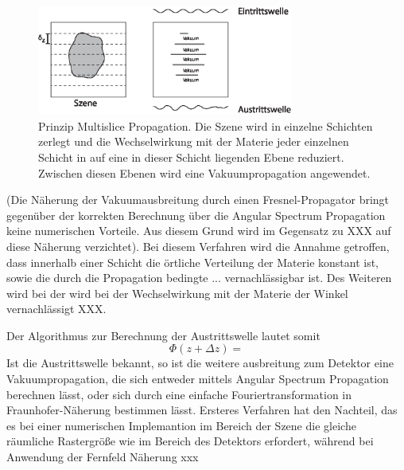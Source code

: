 	\begin{figure}
		\centering
		\includegraphics[width=0.75\textwidth]{images/multislice.eps}
		\caption[Abbildungstext im Abbildungsverzeichnis]{Prinzip Multislice Propagation. Die Szene wird in einzelne Schichten zerlegt und die Wechselwirkung mit der Materie jeder einzelnen Schicht in auf eine in dieser Schicht liegenden Ebene reduziert. Zwischen diesen Ebenen wird eine Vakuumpropagation angewendet.}
		\label{Abb:BspAbbildung}
	\end{figure} 
	
	(Die Näherung der Vakuumausbreitung durch einen Fresnel-Propagator bringt gegenüber der korrekten Berechnung über die Angular Spectrum Propagation keine numerischen Vorteile. Aus diesem Grund wird im Gegensatz zu \cite{hare}XXX auf diese Näherung verzichtet). 
	Bei diesem Verfahren wird die Annahme getroffen, dass  innerhalb einer Schicht die örtliche Verteilung der Materie konstant ist, sowie die durch die Propagation bedingte ... vernachlässigbar ist\cite{hare1994}. Des Weiteren wird bei der wird bei der Wechselwirkung mit der Materie der Winkel vernachlässigt XXX.
	
	Der Algorithmus zur Berechnung der Austrittswelle lautet somit
	\begin{equation}
\Phi(z+\Delta z)=
	\end{equation}
	Ist die Austrittswelle bekannt, so ist die weitere ausbreitung zum Detektor eine Vakuumpropagation, die sich entweder mittels Angular Spectrum Propagation berechnen lässt, oder sich durch eine einfache Fouriertransformation in Fraunhofer-Näherung bestimmen lässt. Ersteres Verfahren hat den Nachteil, das es bei einer numerischen Implemantion im Bereich der Szene die gleiche räumliche Rastergröße wie im Bereich des Detektors erfordert, während bei Anwendung der Fernfeld Näherung xxx
